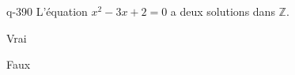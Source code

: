 \begin{truefalse}{q-390}
L'équation $x^2-3x+2=0$ a deux solutions dans $\mathbb Z$.
\item* Vrai
\item Faux
\end{truefalse}

